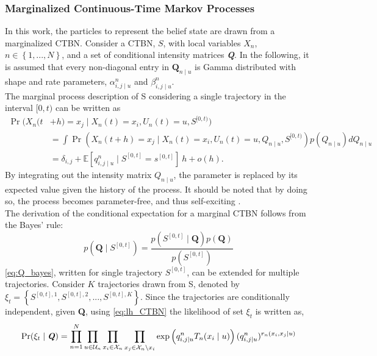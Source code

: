 \subsubsection{Marginalized Continuous-Time Markov Processes}
\label{sec:marg_ctbn}
In this work, the particles to represent the belief state are drawn from a marginalized CTBN. Consider a CTBN, $ S $, with local variables $ X_n $, $ n\in \left\lbrace 1,...,N \right\rbrace $, and a set of conditional intensity matrices \textbf{\textit{Q}}. In the following, it is assumed that every non-diagonal entry in $ \textbf{Q}_{n\mid u} $ is Gamma distributed with shape and rate parameters, $ \alpha^n_{i,j\mid u} $ and $ \beta^n_{i,j\mid u} $.\\
The marginal process description of S considering a single trajectory in the interval $ [0,t) $ can be written as
\begin{align}
\operatorname{Pr}(X_n(t &+ h) = x_j \mid X_n(t)=x_i, U_n(t)=u, S^{[0, t)})\\
&= \int \operatorname{Pr}(X_n(t + h) = x_j \mid X_n(t)=x_i, U_n(t)=u, Q_{n\mid u}, S^{[0, t)})p(Q_{n\mid u})dQ_{n\mid u}\\
&= \delta_{i,j} + \mathbb{E}[q^n_{i,j\mid u} \mid S^{[0, t]} = s^{[0, t]}]\ h + o(h).
\label{eq:marginal_CTBN}
\end{align}
By integrating out the intensity matrix $ Q_{n\mid u} $, the parameter is replaced by its expected value given the history of the process. It should be noted that by doing so, the process becomes parameter-free, and thus self-exciting \cite{Studer2016}. \\
The derivation of the conditional expectation for a marginal CTBN follows from the Bayes' rule:
\begin{equation}
p\left(\textbf{Q} \mid S^{[0,t]}\right)=\frac{p\left(S^{[0,t]} \mid \textbf{Q}\right) p(\textbf{Q})}{p\left(S^{[0,t]}\right)}
\label{eq:Q_bayes}
\end{equation}
\autoref{eq:Q_bayes}, written for single trajectory $ S^{[0,t]} $, can be extended for multiple trajectories. Consider $ K $ trajectories drawn from S, denoted by $ \xi_t = \left\lbrace S^{[0,t], 1}, S^{[0,t], 2}, ..., S^{[0,t], K} \right\rbrace  $. Since the trajectories are conditionally independent, given \textbf{Q}, using \autoref{eq:lh_CTBN} the likelihood of set $ \xi_t $ is written as,
\begin{align}
\operatorname{Pr}( \xi_t  \mid \textbf{\textit{Q}} ) = \prod_{n=1}^{N} \prod_{u \in \mathcal{U}_{n}} \prod_{x_i \in \mathcal{X}_{n}} \prod_{x_j \in \mathcal{X}_{n} \backslash x_i}
\exp \left( q_{i,j\mid u}^{n} T_{n}(x_i\mid u)\right) (q_{i,j\mid u}^{n})^{r_{n}(x_i, x_j\mid u)}
\label{eq:lh_dataset_CTBN}
\end{align}
